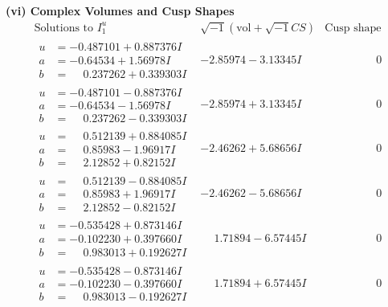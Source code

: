 \documentclass[1p]{elsarticle_modified}
\theoremstyle{definition}
\newcommand{\I}{\sqrt{-1}}
\begin{document}
\newpage\flushleft \textbf{(vi) Complex Volumes and Cusp Shapes}
$$\begin{array}{c|c|c}  
\text{Solutions to }I^u_{1}& \I (\text{vol} + \sqrt{-1}CS) & \text{Cusp shape}\\
 \hline 
\begin{aligned}
u &= -0.487101 + 0.887376 I \\
a &= -0.64534 + 1.56978 I \\
b &= \phantom{-}0.237262 + 0.339303 I\end{aligned}
 & -2.85974 - 3.13345 I & \phantom{-0.000000 } 0 \\ \hline\begin{aligned}
u &= -0.487101 - 0.887376 I \\
a &= -0.64534 - 1.56978 I \\
b &= \phantom{-}0.237262 - 0.339303 I\end{aligned}
 & -2.85974 + 3.13345 I & \phantom{-0.000000 } 0 \\ \hline\begin{aligned}
u &= \phantom{-}0.512139 + 0.884085 I \\
a &= \phantom{-}0.85983 - 1.96917 I \\
b &= \phantom{-}2.12852 + 0.82152 I\end{aligned}
 & -2.46262 + 5.68656 I & \phantom{-0.000000 } 0 \\ \hline\begin{aligned}
u &= \phantom{-}0.512139 - 0.884085 I \\
a &= \phantom{-}0.85983 + 1.96917 I \\
b &= \phantom{-}2.12852 - 0.82152 I\end{aligned}
 & -2.46262 - 5.68656 I & \phantom{-0.000000 } 0 \\ \hline\begin{aligned}
u &= -0.535428 + 0.873146 I \\
a &= -0.102230 + 0.397660 I \\
b &= \phantom{-}0.983013 + 0.192627 I\end{aligned}
 & \phantom{-}1.71894 - 6.57445 I & \phantom{-0.000000 } 0 \\ \hline\begin{aligned}
u &= -0.535428 - 0.873146 I \\
a &= -0.102230 - 0.397660 I \\
b &= \phantom{-}0.983013 - 0.192627 I\end{aligned}
 & \phantom{-}1.71894 + 6.57445 I & \phantom{-0.000000 } 0 \\ \hline\begin{aligned}

\end{aligned}
\end{array}$$
\end{document}
